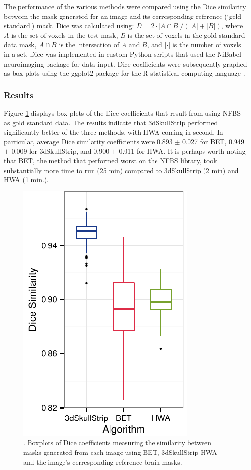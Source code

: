 \par The performance of the various methods were compared using the Dice similarity \cite{Dice1945} between the mask generated for an image and its corresponding reference (`gold standard') mask. Dice was calculated using: $D = 2 \cdot | A \cap B | / (|A| + |B|)$, where $A$ is the set of voxels in the test mask, $B$ is the set of voxels in the gold standard data mask, $A \cap B$ is the intersection of $A$ and $B$, and $|\cdot|$ is the number of voxels in a set. Dice was implemented in custom Python scripts that used the NiBabel neuroimaging package \cite{NiBabel} for data input. Dice coefficients were subsequently graphed as box plots using the ggplot2 package \cite{Wickham2009} for the R statistical computing language \cite{R}.


\subsubsection*{Results}
Figure \ref{fig:boxplot_NFBS} displays box plots of the Dice coefficients that result from using NFBS as gold standard data. The results indicate that 3dSkullStrip performed significantly better of the three methods, with HWA coming in second. In particular, average Dice similarity coefficients were 0.893 $\pm$ 0.027 for BET, 0.949 $\pm$ 0.009 for 3dSkullStrip, and 0.900 $\pm$ 0.011 for HWA. It is perhaps worth noting that BET, the method that performed worst on the NFBS library, took substantially more time to run (25 min) compared to 3dSkullStrip (2 min) and HWA (1 min.).

\begin{figure}[h!]
    \includegraphics[]{boxplot_nfbs.pdf}
    \caption{. Boxplots of Dice coefficients measuring the similarity between masks generated from each image using BET, 3dSkullStrip HWA and the image's corresponding reference brain masks. }
    \label{fig:boxplot_NFBS}
\end{figure}

